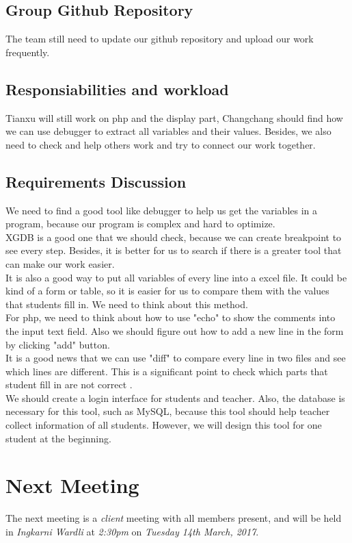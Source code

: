 \documentclass[11pt, a4paper]{article}
\begin{document}
\subsection{Group Github Repository}

The team still need to update our github repository and upload our work frequently. \\

\subsection{Responsiabilities and workload}

Tianxu will still work on php and the display part, Changchang should find how we can use debugger to extract all variables and their values. Besides, we also need to check and help others work and try to connect our work together.\\


\subsection{Requirements Discussion}

We need to find a good tool like debugger to help us get the variables in a program, because our program is complex and hard to optimize.\\ 

XGDB is a good one that we should check, because we can create breakpoint to see every step. Besides, it is better for us to search if there is a greater tool that can make our work easier.\\

It is also a good way to put all variables of every line into a excel file. It could be kind of a form or table, so it is easier for us to compare them with the values that students fill in. We need to think about this method.\\

For php, we need to think about how to use "echo" to show the comments into the input text field. Also we should figure out how to add a new line in the form by clicking "add" button.\\

It is a good news that we can use "diff" to compare every line in two files and see which lines are different. This is a significant point to check which parts that student fill in are not correct .\\

We should create a login interface for students and teacher. Also, the database is necessary for this tool, such as MySQL, because this tool should help teacher collect information of all students. However, we will design this tool for one student at the beginning.






\section{Next Meeting}
The next meeting is a \emph{client} meeting with all members present, and will be held in \emph{Ingkarni Wardli } at \emph{2:30pm} on \emph{Tuesday 14th March, 2017}.
\end{document}
